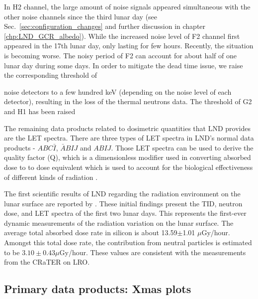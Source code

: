 In H2 channel, the large amount of noise signals appeared simultaneous with the other noise channels since the third lunar day (see Sec.~\ref{sec:configuration_changes} and further discussion in chapter \ref{chp:LND_GCR_albedo}). While the increased noise level of F2 channel first appeared in the 17th lunar day, only lasting for few hours. Recently, the situation is becoming worse. The noisy period of F2 can account for about half of one lunar day during some days. In order to mitigate the dead time issue, we raise the corresponding threshold of 

noise detectors to a few hundred keV (depending on the noise level of each detector), resulting in the loss of the thermal neutrons data. The threshold of G2 and H1 has been raised 


The remaining data products related to dosimetric quantities that \ac{LND} provides are the \ac{LET} spectra. There are three types of \ac{LET} spectra in \ac{LND}'s normal data products - $ABC\bar{I}$, $\bar{A}BIJ$ and $ABIJ$. Those \ac{LET} spectra can be used to derive the quality factor (Q), which is a dimensionless modifier used in converting absorbed dose to to dose equivalent which is used to account for the biological effectiveness of different kinds of radiation \citep{Kerr1988Qualityfacgtor}.


The first scientific results of \ac{LND} regarding the radiation environment on the lunar surface are reported by \citet{Zhang2020SciAdv}. These initial findings present the \ac{TID}, neutron dose, and \ac{LET} spectra of the first two lunar days. This represents the first-ever dynamic measurements of the radiation variation on the lunar surface. The average total absorbed dose rate in silicon is about 13.59$\pm$1.01 $\mu$Gy/hour. Amongst this total dose rate, the contribution from neutral particles is estimated to be $3.10 \pm 0.43 \mu$Gy/hour. These values are consistent with the measurements from the \ac{CRaTER} on \ac{LRO}.



\subsection*{Primary data products: Xmas plots}
\label{sec:xmas}

